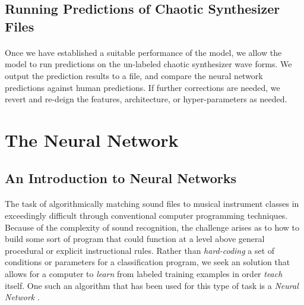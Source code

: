 \documentclass[12pt,letterpaper]{article}
\begin{document}

\subsection{Running Predictions of Chaotic Synthesizer Files}

\paragraph*{}Once we have established a suitable performance of the model, we allow the model to run predictions on the un-labeled chaotic synthesizer wave forms. We output the prediction results to a file, and compare the neural network predictions against human predictions. If further corrections are needed, we revert and re-deign the features, architecture, or hyper-parameters as needed.


\newpage
\section{The Neural Network}
\label{sec-TheNeuralNetwork}


\subsection{An Introduction to Neural Networks}
\label{subsec-NerualNetworkIntro}

\paragraph*{}The task of algorithmically matching sound files to musical instrument classes in exceedingly difficult through conventional computer programming techniques. Because of the complexity of sound recognition, the challenge arises as to how to build some sort of program that could function at a level above general procedural or explicit instructional rules. Rather than \textit{hard-coding} a set of conditions or parameters for a classification program, we seek an solution that allows for a computer to \textit{learn} from labeled training examples in order \textit{teach} itself. One such an algorithm that has been used for this type of task is a \textit{Neural Network} \cite{Geron2,Goodfellow,Levine,Virtanen}.
\end{document}
